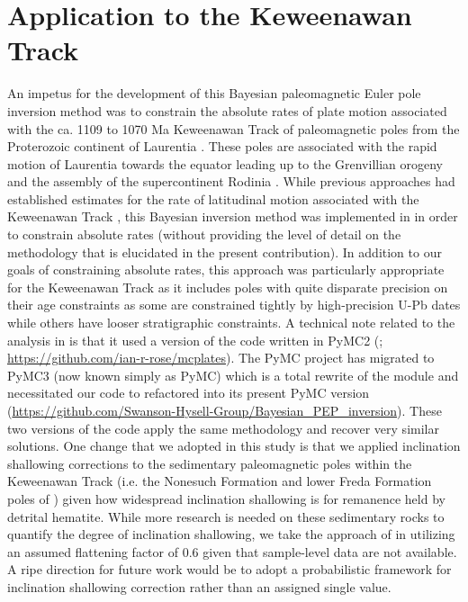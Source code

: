 \documentclass[11pt,letterpaper]{article}
\begin{document}
\section*{Application to the Keweenawan Track}
\label{sec:keweenawan}

An impetus for the development of this Bayesian paleomagnetic Euler pole inversion method was to constrain the absolute rates of plate motion associated with the ca. 1109 to 1070 Ma Keweenawan Track of paleomagnetic poles from the Proterozoic continent of Laurentia \citep{Halls1982a, Swanson-Hysell2009a, Swanson-Hysell2019a}. These poles are associated with the rapid motion of Laurentia towards the equator leading up to the Grenvillian orogeny and the assembly of the supercontinent Rodinia \citep{Swanson-Hysell2021a}. While previous approaches had established estimates for the rate of latitudinal motion associated with the Keweenawan Track \citep{Davis1997a, Swanson-Hysell2014b}, this Bayesian inversion method was implemented in \cite{Swanson-Hysell2019a} in order to constrain absolute rates (without providing the level of detail on the methodology that is elucidated in the present contribution). In addition to our goals of constraining absolute rates, this approach was particularly appropriate for the Keweenawan Track as it includes poles with quite disparate precision on their age constraints as some are constrained tightly by high-precision U-Pb dates \citep[e.g.][]{Fairchild2017a} while others have looser stratigraphic constraints. A technical note related to the analysis in \cite{Swanson-Hysell2019a} is that it used a version of the code written in PyMC2 (\citealp{Patil2010a}; \url{https://github.com/ian-r-rose/mcplates}). The PyMC project has migrated to PyMC3 (now known simply as PyMC) which is a total rewrite of the module \citep{Salvatier2016a} and necessitated our code to refactored into its present PyMC version (\url{https://github.com/Swanson-Hysell-Group/Bayesian_PEP_inversion}). These two versions of the code apply the same methodology and recover very similar solutions. One change that we adopted in this study is that we applied inclination shallowing corrections to the sedimentary paleomagnetic poles within the Keweenawan Track (i.e. the Nonesuch Formation and lower Freda Formation poles of \cite{Henry1977a}) given how widespread inclination shallowing is for remanence held by detrital hematite. While more research is needed on these sedimentary rocks to quantify the degree of inclination shallowing, we take the approach of \cite{Domeier2012a} in utilizing an assumed flattening factor of 0.6 given that sample-level data are not available. A ripe direction for future work would be to adopt a probabilistic framework for inclination shallowing correction rather than an assigned single value.
\end{document}
